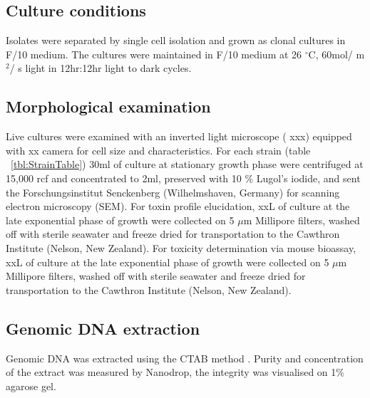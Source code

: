 \documentclass[12pt]{article}
\begin{document}
\subsection{Culture conditions}
Isolates were separated by single cell isolation and grown as clonal cultures in F/10 medium. The cultures were maintained in F/10 medium at 26 $^{\circ}$C, 60mol/ m$^{2}$/ s light in 12hr:12hr light to dark cycles.

\subsection{Morphological examination}
Live cultures were examined with an inverted light microscope ( xxx) equipped with xx camera for cell size and characteristics. For each strain (table ~\ref{tbl:StrainTable})  30ml of culture at stationary growth phase were centrifuged at 15,000 rcf and concentrated to 2ml, preserved with 10 \% Lugol's iodide, and sent the Forschungsinstitut Senckenberg (Wilhelmshaven, Germany) for scanning electron microscopy (SEM). For toxin profile elucidation, xxL of culture at the late exponential phase of growth were collected on 5 $\mu$m Millipore filters, washed off with sterile seawater and freeze dried for transportation to the Cawthron Institute (Nelson, New Zealand). For toxicity determination via mouse bioassay, xxL of culture at the late exponential phase of growth were collected on 5 $\mu$m Millipore filters, washed off with sterile seawater and freeze dried for transportation to the Cawthron Institute (Nelson, New Zealand).

\subsection{Genomic DNA extraction}
Genomic DNA was extracted using the CTAB method \cite{zhou1999analysis}. Purity and concentration of the extract was measured by Nanodrop, the integrity was visualised on 1\% agarose gel.
\end{document}
